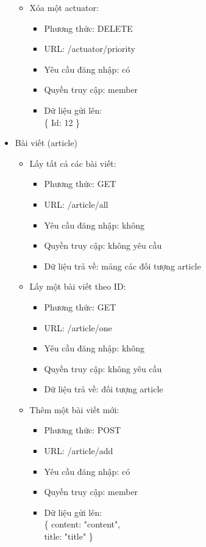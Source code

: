 \documentclass[a4paper,12pt,oneside]{article}
\begin{document}
\begin{itemize}
\begin{itemize}
\item Xóa một actuator:
	\begin{itemize}
	\item Phương thức: DELETE
	\item URL: /actuator/priority
	\item Yêu cầu đăng nhập: có
	\item Quyền truy cập: member
	\item Dữ liệu gửi lên:\\ 
		\{
			Id: 12
		\}
	\end{itemize}

\end{itemize}

\item Bài viết (article)
\begin{itemize}
\item Lấy tất cả các bài viết:
	\begin{itemize}
	\item Phương thức: GET
	\item URL: /article/all
	\item Yêu cầu đăng nhập: không
	\item Quyền truy cập: không yêu cầu
	\item Dữ liệu trả về: mảng các đối tượng article
	\end{itemize}

\item Lấy một bài viết theo ID:
	\begin{itemize}
	\item Phương thức: GET
	\item URL: /article/one
	\item Yêu cầu đăng nhập: không
	\item Quyền truy cập: không yêu cầu
	\item Dữ liệu trả về: đối tượng article
	\end{itemize}

\item Thêm một bài viết mới:
	\begin{itemize}
	\item Phương thức: POST
	\item URL: /article/add
	\item Yêu cầu đăng nhập: có
	\item Quyền truy cập: member
	\item Dữ liệu gửi lên:\\
		\{
			content: "content",\\
			title: "title"
		\}
	

\end{itemize}
\end{itemize}
\end{itemize}
\end{document}
